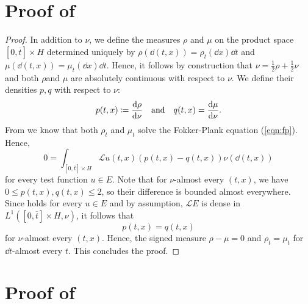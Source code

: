 \section{Proof of }\label{prf:thm:mbsde}
\restatethmmbsde*
\begin{proof}
  In addition to \(\nu\), we define the measures \(\rho\) and \(\mu\) on the product space \([0, \overline{t}] \times H\) determined uniquely by \(\rho(\dd{(t, x)}) = \rho_{t}(\dd{x}) \dd{t}\) and \(\mu(\dd{(t, x)}) = \mu_{t}(\dd{x}) \dd{t}\). Hence, it follows by construction that \(\nu = \frac{1}{2} \rho + \frac{1}{2} \nu\) and both \(\rho\)and \(\mu\) are absolutely continuous with respect to \(\nu\). We define their densities \(p, q\) with respect to \(\nu\):
  \[
    p(t, x) \coloneqq \dv{\rho}{\nu}(t, x) \qand q(t, x) = \dv{\mu}{\nu}(t, x).
  \]
  From  we know that both \(\rho_{t}\) and \(\mu_{t}\) solve the Fokker-Plank equation (\ref{eqn:fp}). Hence,
  \begin{equation}
    0 = \int_{[0, \overline{t}] \times H} \mathcal{L} u(t, x) (p(t, x)  -q(t, x)) \nu(\dd{(t, x)}) \label{eqn:fpuniq}
  \end{equation}
  for every test function \(u \in E\). Note that for \(\nu\)-almost every \((t, x)\), we have \(0 \leq p(t, x), q(t, x) \leq 2\), so their difference is bounded almost everywhere. Since  holds for every \(u \in E\) and by assumption, \(\mathcal{L} E\) is dense in \(L^{1}([0, \overline{t}] \times H, \nu)\), it follows that
  \[
    p(t, x) = q(t, x)
  \]
  for \(\nu\)-almost every \((t, x)\). Hence, the signed measure \(\rho - \mu = 0\) and \(\rho_{t} = \mu_{t}\) for \(\dd{t}\)-almost every \(t\). This  concludes the proof.
\end{proof}


\section{Proof of }\label{prf:lem:bayes}
\restatelembayes*

